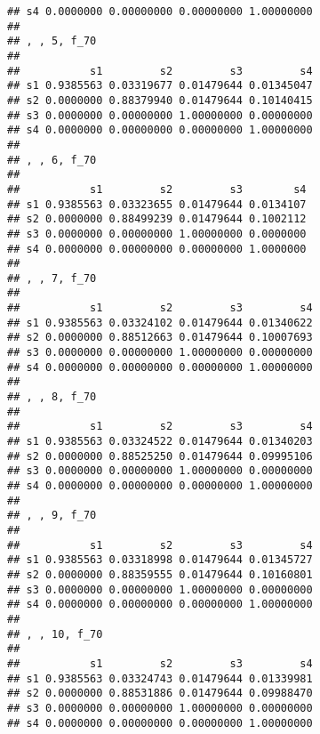 \documentclass[
]{article}
\begin{document}
\begin{verbatim}
## s4 0.0000000 0.00000000 0.00000000 1.00000000
## 
## , , 5, f_70
## 
##           s1         s2         s3         s4
## s1 0.9385563 0.03319677 0.01479644 0.01345047
## s2 0.0000000 0.88379940 0.01479644 0.10140415
## s3 0.0000000 0.00000000 1.00000000 0.00000000
## s4 0.0000000 0.00000000 0.00000000 1.00000000
## 
## , , 6, f_70
## 
##           s1         s2         s3        s4
## s1 0.9385563 0.03323655 0.01479644 0.0134107
## s2 0.0000000 0.88499239 0.01479644 0.1002112
## s3 0.0000000 0.00000000 1.00000000 0.0000000
## s4 0.0000000 0.00000000 0.00000000 1.0000000
## 
## , , 7, f_70
## 
##           s1         s2         s3         s4
## s1 0.9385563 0.03324102 0.01479644 0.01340622
## s2 0.0000000 0.88512663 0.01479644 0.10007693
## s3 0.0000000 0.00000000 1.00000000 0.00000000
## s4 0.0000000 0.00000000 0.00000000 1.00000000
## 
## , , 8, f_70
## 
##           s1         s2         s3         s4
## s1 0.9385563 0.03324522 0.01479644 0.01340203
## s2 0.0000000 0.88525250 0.01479644 0.09995106
## s3 0.0000000 0.00000000 1.00000000 0.00000000
## s4 0.0000000 0.00000000 0.00000000 1.00000000
## 
## , , 9, f_70
## 
##           s1         s2         s3         s4
## s1 0.9385563 0.03318998 0.01479644 0.01345727
## s2 0.0000000 0.88359555 0.01479644 0.10160801
## s3 0.0000000 0.00000000 1.00000000 0.00000000
## s4 0.0000000 0.00000000 0.00000000 1.00000000
## 
## , , 10, f_70
## 
##           s1         s2         s3         s4
## s1 0.9385563 0.03324743 0.01479644 0.01339981
## s2 0.0000000 0.88531886 0.01479644 0.09988470
## s3 0.0000000 0.00000000 1.00000000 0.00000000
## s4 0.0000000 0.00000000 0.00000000 1.00000000
\end{verbatim}
\end{document}
